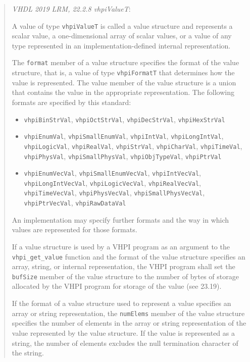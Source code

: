 \documentclass[
]{article}
\providecommand{\tightlist}{%
  \setlength{\itemsep}{0pt}\setlength{\parskip}{0pt}}
\begin{document}
\begin{quote}
\emph{VHDL 2019 LRM, 22.2.8 vhpiValueT}:

A value of type \texttt{vhpiValueT} is called a value structure and represents a scalar value, a one-dimensional array of scalar values, or a value of any type represented in an implementation-defined internal representation.

The \texttt{format} member of a value structure specifies the format of the value structure, that is, a value of type \texttt{vhpiFormatT} that determines how the value is represented. The value member of the value structure is a union that contains the value in the appropriate representation. The following formats are specified by this standard:

\begin{itemize}
\tightlist
\item
  \texttt{vhpiBinStrVal}, \texttt{vhpiOctStrVal}, \texttt{vhpiDecStrVal}, \texttt{vhpiHexStrVal}
\item
  \texttt{vhpiEnumVal}, \texttt{vhpiSmallEnumVal}, \texttt{vhpiIntVal}, \texttt{vhpiLongIntVal}, \texttt{vhpiLogicVal}, \texttt{vhpiRealVal}, \texttt{vhpiStrVal}, \texttt{vhpiCharVal}, \texttt{vhpiTimeVal}, \texttt{vhpiPhysVal}, \texttt{vhpiSmallPhysVal}, \texttt{vhpiObjTypeVal}, \texttt{vhpiPtrVal}
\item
  \texttt{vhpiEnumVecVal}, \texttt{vhpiSmallEnumVecVal}, \texttt{vhpiIntVecVal}, \texttt{vhpiLongIntVecVal}, \texttt{vhpiLogicVecVal}, \texttt{vhpiRealVecVal}, \texttt{vhpiTimeVecVal}, \texttt{vhpiPhysVecVal}, \texttt{vhpiSmallPhysVecVal}, \texttt{vhpiPtrVecVal}, \texttt{vhpiRawDataVal}
\end{itemize}

An implementation may specify further formats and the way in which values are represented for those formats.

If a value structure is used by a VHPI program as an argument to the \texttt{vhpi\_get\_value} function and the format of the value structure specifies an array, string, or internal representation, the VHPI program shall set the \texttt{bufSize} member of the value structure to the number of bytes of storage allocated by the VHPI program for storage of the value (see 23.19).

If the format of a value structure used to represent a value specifies an array or string representation, the \texttt{numElems} member of the value structure specifies the number of elements in the array or string representation of the value represented by the value structure. If the value is represented as a string, the number of elements excludes the null termination character of the string.


\end{quote}
\end{document}
